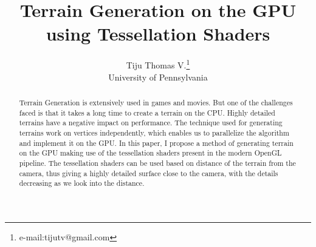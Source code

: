 \documentclass[annual]{acmsiggraph}
\title{Terrain Generation on the GPU using Tessellation Shaders}
\author{Tiju Thomas V.\thanks{e-mail:tijutv@gmail.com}\\University of Pennsylvania}
\begin{document}

\maketitle

\begin{abstract}

Terrain Generation is extensively used in games and movies. But one of the challenges faced is that it takes a long time to create a terrain on the CPU.  Highly detailed terrains have a negative impact on  performance. The technique used for generating terrains work on vertices independently, which enables us to parallelize the algorithm and implement it on the GPU. In this paper, I propose a method of generating terrain on the GPU making use of the tessellation shaders present in the modern OpenGL pipeline. The tessellation shaders can be used based on distance of the terrain from the camera, thus giving a highly detailed surface close to the camera, with the details decreasing as we look into the distance.

\end{abstract}
\end{document}
